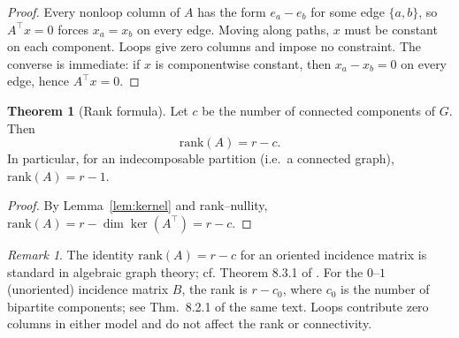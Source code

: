 \documentclass[11pt]{article}
\numberwithin{equation}{section}
\theoremstyle{plain}
\theoremstyle{definition}
\theoremstyle{definition}
\theoremstyle{assumption}
\theoremstyle{proposition}
\theoremstyle{proposition}
\theoremstyle{example}
\theoremstyle{lemma}
\theoremstyle{theorem}
\newtheorem{theorem}{Theorem}[section]
\theoremstyle{remark}
\newtheorem*{remark}{Remark}
\begin{document}
\begin{proof}
Every nonloop column of $A$ has the form $e_a-e_b$ for some edge $\{a,b\}$, so $A^\top x=0$ forces $x_a=x_b$ on every edge. Moving along paths, $x$ must be constant on each component. Loops give zero columns and impose no constraint. The converse is immediate: if $x$ is componentwise constant, then $x_a-x_b=0$ on every edge, hence $A^\top x=0$.
\end{proof}

\begin{theorem}[Rank formula]\label{thm:rank}
Let $c$ be the number of connected components of $G$. Then
\[
\mathrm{rank}(A)=r-c.
\]
In particular, for an indecomposable partition (i.e.\ a connected graph), $\mathrm{rank}(A)=r-1$.
\end{theorem}

\begin{proof}
By Lemma~\ref{lem:kernel} and rank--nullity,
\(
\mathrm{rank}(A)=r-\dim\ker(A^\top)=r-c.
\)
\end{proof}

\begin{remark}
The identity $\mathrm{rank}(A)=r-c$ for an oriented incidence matrix is standard in algebraic graph theory; cf. Theorem 8.3.1 of \citet{godsil2013algebraic}. For the $0$--$1$ (unoriented) incidence matrix $B$, the rank is $r-c_0$, where $c_0$ is the number of bipartite components; see Thm.~8.2.1 of the same text. Loops contribute zero columns in either model and do not affect the rank or connectivity.
\end{remark}
\end{document}
